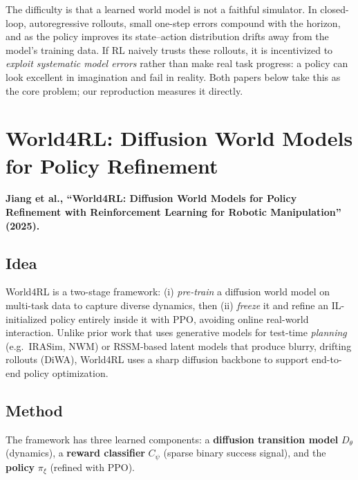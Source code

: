 \documentclass[11pt]{article}
\begin{document}
The difficulty is that a learned world model is not a faithful simulator. In closed-loop, autoregressive
rollouts, small one-step errors compound with the horizon, and as the policy improves its state--action
distribution drifts away from the model's training data. If RL naively trusts these rollouts, it is
incentivized to \emph{exploit systematic model errors} rather than make real task progress: a policy can
look excellent in imagination and fail in reality. Both papers below take this as the core problem; our
reproduction measures it directly.

\section{World4RL: Diffusion World Models for Policy Refinement}
\textbf{Jiang et al., ``World4RL: Diffusion World Models for Policy Refinement with Reinforcement
Learning for Robotic Manipulation'' (2025).}

\subsection{Idea}
World4RL is a two-stage framework: (i) \emph{pre-train} a diffusion world model on multi-task data to
capture diverse dynamics, then (ii) \emph{freeze} it and refine an IL-initialized policy entirely inside
it with PPO, avoiding online real-world interaction. Unlike prior work that uses generative models for
test-time \emph{planning} (e.g.\ IRASim, NWM) or RSSM-based latent models that produce blurry, drifting
rollouts (DiWA), World4RL uses a sharp diffusion backbone to support end-to-end policy optimization.

\subsection{Method}
The framework has three learned components: a \textbf{diffusion transition model} $D_\theta$
(dynamics), a \textbf{reward classifier} $C_\psi$ (sparse binary success signal), and the
\textbf{policy} $\pi_\xi$ (refined with PPO).
\end{document}
